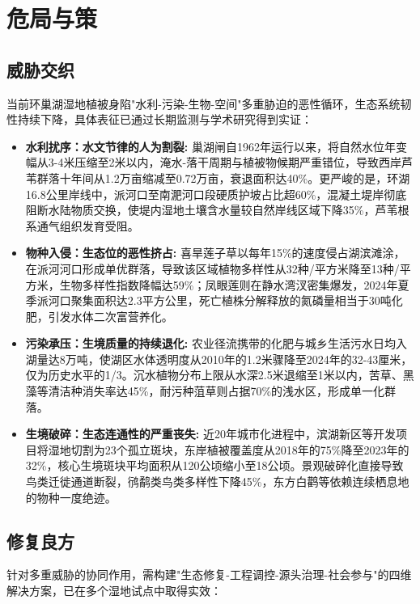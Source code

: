 
\section{危局与策}

\subsection{威胁交织}
当前环巢湖湿地植被身陷"水利-污染-生物-空间"多重胁迫的恶性循环，生态系统韧性持续下降，具体表征已通过长期监测与学术研究得到实证：
\begin{itemize}
    \item \textbf{水利扰序：水文节律的人为割裂:}
    巢湖闸自1962年运行以来，将自然水位年变幅从3-4米压缩至2米以内，淹水-落干周期与植被物候期严重错位，导致西岸芦苇群落十年间从1.2万亩缩减至0.72万亩，衰退面积达40\%。更严峻的是，环湖16.8公里岸线中，派河口至南淝河口段硬质护坡占比超60\%，混凝土堤岸彻底阻断水陆物质交换，使堤内湿地土壤含水量较自然岸线区域下降35\%，芦苇根系通气组织发育受阻。

    \item \textbf{物种入侵：生态位的恶性挤占:} 喜旱莲子草以每年15\%的速度侵占湖滨滩涂，在派河河口形成单优群落，导致该区域植物多样性从32种/平方米降至13种/平方米，生物多样性指数降幅达59\%；凤眼莲则在静水湾汊密集爆发，2024年夏季派河口聚集面积达2.3平方公里，死亡植株分解释放的氮磷量相当于30吨化肥，引发水体二次富营养化。

    \item \textbf{污染承压：生境质量的持续退化:} 农业径流携带的化肥与城乡生活污水日均入湖量达8万吨，使湖区水体透明度从2010年的1.2米骤降至2024年的32-43厘米，仅为历史水平的1/3。沉水植物分布上限从水深2.5米退缩至1米以内，苦草、黑藻等清洁种消失率达45\%，耐污种菹草则占据70\%的浅水区，形成单一化群落。

    \item \textbf{生境破碎：生态连通性的严重丧失:} 近20年城市化进程中，滨湖新区等开发项目将湿地切割为23个孤立斑块，东岸植被覆盖度从2018年的75\%降至2023年的32\%，核心生境斑块平均面积从120公顷缩小至18公顷。景观破碎化直接导致鸟类迁徙通道断裂，鸻鹬类鸟类多样性下降45\%，东方白鹳等依赖连续栖息地的物种一度绝迹。
\end{itemize}

\subsection{修复良方}
针对多重威胁的协同作用，需构建"生态修复-工程调控-源头治理-社会参与"的四维解决方案，已在多个湿地试点中取得实效：


